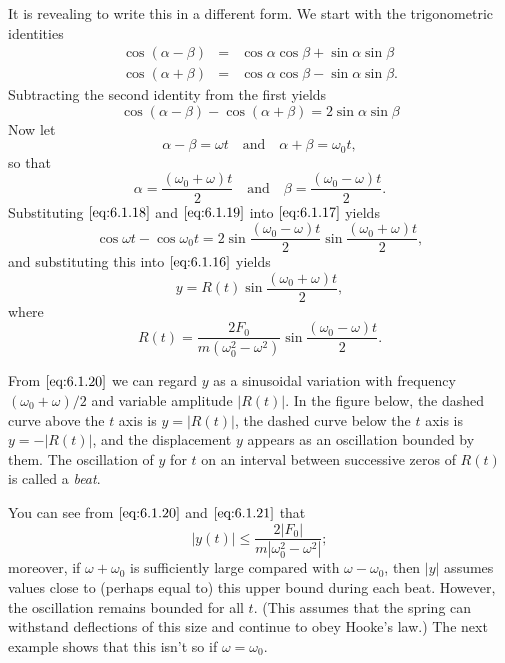 \documentclass{ximera}
\begin{document}
\begin{example}
\begin{explanation}
It is revealing to write this in a different form.  We start with the
trigonometric identities
\begin{eqnarray*}
\cos(\alpha-\beta)&=&\cos\alpha\cos\beta+\sin\alpha\sin\beta\\
\cos(\alpha+\beta)&=&\cos\alpha\cos\beta-\sin\alpha\sin\beta.
\end{eqnarray*}
Subtracting the second identity from the first yields
\begin{equation}\label{eq:6.1.17}
\cos(\alpha-\beta)-\cos(\alpha+\beta)=2\sin\alpha\sin\beta
\end{equation}
 Now let
\begin{equation}\label{eq:6.1.18}
\alpha-\beta=\omega t\quad\mbox{and}\quad\alpha+\beta=\omega_0t,
\end{equation}
 so that
\begin{equation}\label{eq:6.1.19}
\alpha=\frac{(\omega_0+\omega)t}{2}\quad\mbox{and}\quad\beta=\frac{(\omega_0-\omega
)t}{2}.
\end{equation}
 Substituting $\eqref{eq:6.1.18}$ and $\eqref{eq:6.1.19}$ into $\eqref{eq:6.1.17}$
yields
 $$
\cos\omega t-\cos\omega_0t=
2\sin\frac{(\omega_0-\omega)t}{2}\sin\frac{(\omega_0+\omega)t}{2},
$$
and substituting this into $\eqref{eq:6.1.16}$ yields
\begin{equation}\label{eq:6.1.20}
y=R(t)\sin\frac{(\omega_0+\omega)t}{2},
\end{equation}
 where
\begin{equation}\label{eq:6.1.21}
R(t)=\frac{2F_0}{m(\omega_0^2-\omega^2)}
\sin\frac{(\omega_0-\omega)t}{2}.
\end{equation}
 
From $\eqref{eq:6.1.20}$ we can regard $y$ as a sinusoidal variation with
frequency $(\omega_0+\omega)/2$ and variable amplitude
$|R(t)|$. In the figure below, the dashed curve above the $t$ axis
is $y=|R(t)|$, the dashed curve below the $t$ axis is $y=-|R(t)|$, and
the displacement $y$ appears as an oscillation bounded by them. The
oscillation of $y$ for $t$ on an interval between successive zeros of
$R(t)$ is called a \textit{beat}.
 
\begin{center}
\end{center}
 
 
 
 
 
You can see from
$\eqref{eq:6.1.20}$ and $\eqref{eq:6.1.21}$ that
$$
|y(t)|\leq\frac{2|F_0|}{m|\omega_0^2-\omega^2|};
$$
moreover, if $\omega+\omega_0$ is sufficiently large compared with $\omega
-\omega_0$, then $|y|$ assumes values close to (perhaps equal to) this
upper bound during each beat. However, the oscillation remains bounded for
all $t$. (This assumes that the spring can withstand
deflections of this size and continue to obey Hooke's law.)  The next
example shows that this isn't  so if $\omega=\omega_0$.
 
\end{explanation}
\end{example}
 
\end{document}

